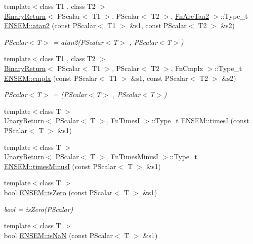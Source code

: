 \begin{DoxyCompactItemize}
{\footnotesize template$<$class T1 , class T2 $>$ }\\\mbox{\hyperlink{structBinaryReturn}{Binary\+Return}}$<$ P\+Scalar$<$ T1 $>$, P\+Scalar$<$ T2 $>$, \mbox{\hyperlink{structFnArcTan2}{Fn\+Arc\+Tan2}} $>$\+::Type\+\_\+t \mbox{\hyperlink{group__primscalar_gac0968ffacdebb29c939e8bfbfc391fd0}{E\+N\+S\+E\+M\+::atan2}} (const P\+Scalar$<$ T1 $>$ \&s1, const P\+Scalar$<$ T2 $>$ \&s2)
\begin{DoxyCompactList}\small\item\em P\+Scalar$<$\+T$>$ = atan2(\+P\+Scalar$<$\+T$>$ , P\+Scalar$<$\+T$>$) \end{DoxyCompactList}\item 
{\footnotesize template$<$class T1 , class T2 $>$ }\\\mbox{\hyperlink{structBinaryReturn}{Binary\+Return}}$<$ P\+Scalar$<$ T1 $>$, P\+Scalar$<$ T2 $>$, Fn\+Cmplx $>$\+::Type\+\_\+t \mbox{\hyperlink{group__primscalar_ga72cf1623c0ae655c15db12ad096194dc}{E\+N\+S\+E\+M\+::cmplx}} (const P\+Scalar$<$ T1 $>$ \&s1, const P\+Scalar$<$ T2 $>$ \&s2)
\begin{DoxyCompactList}\small\item\em P\+Scalar$<$\+T$>$ = (P\+Scalar$<$\+T$>$ , P\+Scalar$<$\+T$>$) \end{DoxyCompactList}\item 
{\footnotesize template$<$class T $>$ }\\\mbox{\hyperlink{structUnaryReturn}{Unary\+Return}}$<$ P\+Scalar$<$ T $>$, Fn\+TimesI $>$\+::Type\+\_\+t \mbox{\hyperlink{group__primscalar_ga70f6abe538ba4ee394447d572f919fc0}{E\+N\+S\+E\+M\+::timesI}} (const P\+Scalar$<$ T $>$ \&s1)
\item 
{\footnotesize template$<$class T $>$ }\\\mbox{\hyperlink{structUnaryReturn}{Unary\+Return}}$<$ P\+Scalar$<$ T $>$, Fn\+Times\+MinusI $>$\+::Type\+\_\+t \mbox{\hyperlink{group__primscalar_gabd11ad8f843bcbe3cfbf91ad061f864a}{E\+N\+S\+E\+M\+::times\+MinusI}} (const P\+Scalar$<$ T $>$ \&s1)
\item 
{\footnotesize template$<$class T $>$ }\\bool \mbox{\hyperlink{group__primscalar_gab10f703e7498f1638c401a92ca8bc947}{E\+N\+S\+E\+M\+::is\+Zero}} (const P\+Scalar$<$ T $>$ \&s1)
\begin{DoxyCompactList}\small\item\em bool = is\+Zero(\+P\+Scalar) \end{DoxyCompactList}\item 
{\footnotesize template$<$class T $>$ }\\bool \mbox{\hyperlink{group__primscalar_ga45c19c10ac52adfa3deff1ead05f3dbc}{E\+N\+S\+E\+M\+::is\+NaN}} (const P\+Scalar$<$ T $>$ \&s1)

\end{DoxyCompactItemize}
